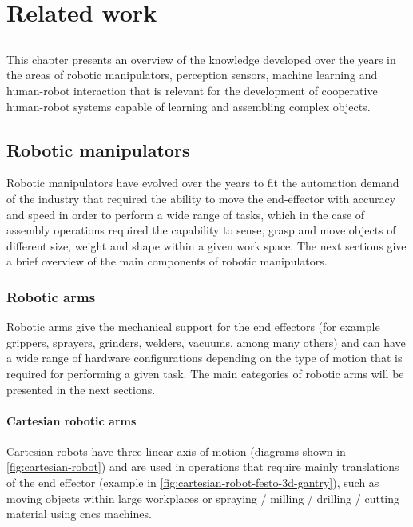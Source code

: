 \chapter{Related work}\label{chap:related-work}

\section*{}

This chapter presents an overview of the knowledge developed over the years in the areas of robotic manipulators, perception sensors, machine learning and human-robot interaction that is relevant for the development of cooperative human-robot systems capable of learning and assembling complex objects.


\section{Robotic manipulators}

Robotic manipulators have evolved over the years to fit the automation demand of the industry that required the ability to move the end-effector with accuracy and speed in order to perform a wide range of tasks, which in the case of assembly operations required the capability to sense, grasp and move objects of different size, weight and shape within a given work space. The next sections give a brief overview of the main components of robotic manipulators.


\subsection{Robotic arms}

Robotic arms give the mechanical support for the end effectors (for example grippers, sprayers, grinders, welders, vacuums, among many others) and can have a wide range of hardware configurations depending on the type of motion that is required for performing a given task. The main categories of robotic arms will be presented in the next sections.


\subsubsection{Cartesian robotic arms}

Cartesian robots have three linear axis of motion (diagrams shown in \cref{fig:cartesian-robot}) and are used in operations that require mainly translations of the end effector (example in \cref{fig:cartesian-robot-festo-3d-gantry}), such as moving objects within large workplaces or spraying / milling / drilling / cutting material using \glspl{cnc} machines.

